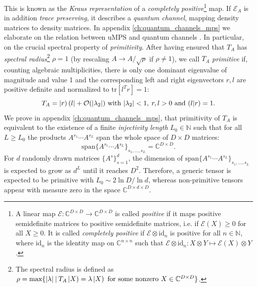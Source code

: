 This is known as the \textit{Kraus representation} of a \textit{completely positive}\footnote{A linear map $\mathcal{E}: \mathbb{C}^{D \times D} \rightarrow \mathbb{C}^{D \times D}$ is called \textit{positive} if it maps positive semidefinite matrices to positive semidefinite matrices, i.e. if $\mathcal{E}(X) \geq 0$ for all $X \geq 0$. It is called \textit{completely positive} if $\mathcal{E} \otimes \mathrm{id}_n$ is positive for all $n \in \mathbb{N}$, where $\mathrm{id}_n$ is the identity map on $\mathbb{C}^{n \times n}$ such that $\mathcal{E} \otimes \mathrm{id}_n: X \otimes Y \mapsto \mathcal{E}(X) \otimes Y$.} map. If $\mathcal{E}_A$ is in addition \textit{trace preserving}, it describes a \textit{quantum channel}, mapping density matrices to density matrices. In appendix \ref{ch:quantum_channels_mps} we elaborate on the relation between uMPS and quantum channels  \cite{wolf2012channels}. In particular, on the crucial spectral property of \textit{primitivity}. After having ensured that $T_A$ has \textit{spectral radius}\footnote{The spectral radius is defined as $\rho = \mathrm{max}\{\vert \lambda \vert \: \vert \: T_A \left| X \right) = \lambda \left| X \right) \text{ for some nonzero } X \in \mathbb{C}^{D \times D}\}$.} $\rho = 1$ (by rescaling $A \rightarrow A / \sqrt{\rho}$ if $\rho \neq 1$), we call $T_A$ \textit{primitive} if, counting algebraic multiplicities, there is only one dominant eigenvalue of magnitude and value 1 and the corresponding left and right eigenvectors $r, l$ are positive definite and normalized to $\mathrm{tr}[l^T r] = 1$:
\begin{equation} \label{eq:primitive_transfer_matrix}
	T_A = \left| r \right)\left( l \right| + \mathcal{O}(\vert \lambda_2 \vert) \text{ with } \vert \lambda_2 \vert < 1, \: r, l > 0 \text{ and } (l \vert r ) = 1.
\end{equation}
We prove in appendix \ref{ch:quantum_channels_mps}, that primitivity of $T_A$ is equivalent to the existence of a finite \textit{injectivity length} $L_0 \in \mathbb{N}$ such that for all $L \geq L_0$ the products $A^{s_1} \cdots A^{s_L}$ span the whole space of $D \times D$ matrices:
\begin{equation}
	\mathrm{span}\{A^{s_1} \cdots A^{s_L}\}_{s_1, \ldots, s_L} = \mathbb{C}^{D \times D}.
\end{equation}
For $d$ randomly drawn matrices $\{A^s\}_{s=1}^d$, the dimension of $\mathrm{span}\{A^{s_1} \cdots A^{s_L}\}_{s_1, \ldots, s_L}$ is expected to grow as $d^L$ until it reaches $D^2$. Therefore, a generic tensor is expected to be primitive with $L_0 \sim 2 \ln D / \ln d$, whereas non-primitive tensors appear with measure zero in the space $\mathbb{C}^{D \times d \times D}$. \cite{perez2007matrix} \\[0.5em]

